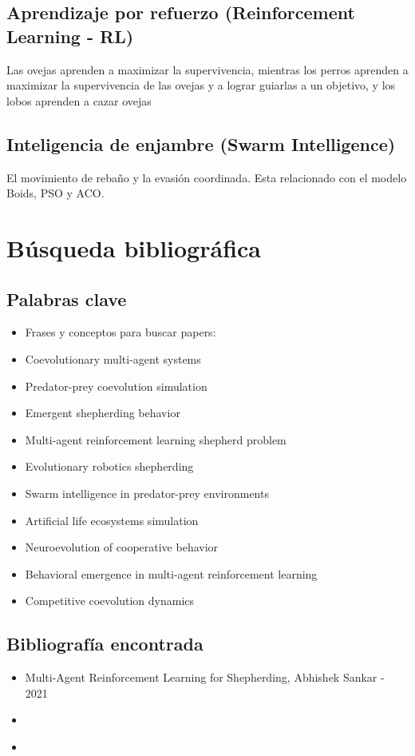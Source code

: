 \documentclass[final]{article}
\begin{document}
\subsection{Aprendizaje por refuerzo (Reinforcement Learning - RL)}
Las ovejas aprenden a maximizar la supervivencia, mientras los perros aprenden a maximizar la supervivencia de las ovejas y a lograr
guiarlas a un objetivo, y los lobos aprenden a cazar ovejas

\subsection{Inteligencia de enjambre (Swarm Intelligence)}
El movimiento de rebaño y la evasión coordinada. Esta relacionado con el modelo Boids, PSO y ACO.

\section{Búsqueda bibliográfica}

\subsection{Palabras clave}
\begin{itemize}
    \item Frases y conceptos para buscar papers:
    \item Coevolutionary multi-agent systems
    \item Predator-prey coevolution simulation
    \item Emergent shepherding behavior
    \item Multi-agent reinforcement learning shepherd problem
    \item Evolutionary robotics shepherding
    \item Swarm intelligence in predator-prey environments
    \item Artificial life ecosystems simulation
    \item Neuroevolution of cooperative behavior
    \item Behavioral emergence in multi-agent reinforcement learning
    \item Competitive coevolution dynamics
\end{itemize}

\subsection{Bibliografía encontrada}

\begin{itemize}
    \item Multi-Agent Reinforcement Learning for Shepherding, Abhishek Sankar - 2021
    \item \citet{NapolitanoShepherding}
    \item \citet{}
\end{itemize}



\end{document}
